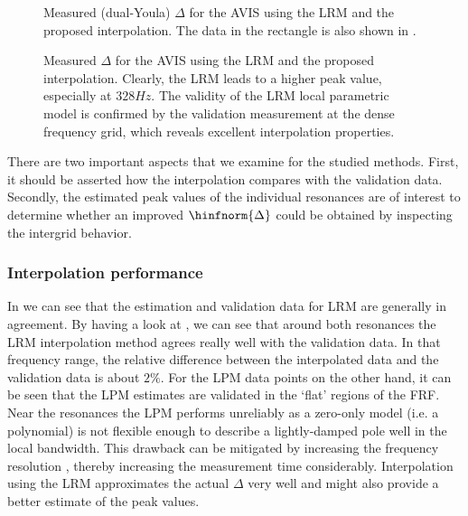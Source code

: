 \begin{figure}
 \centering
    \setlength{\figurewidth}{0.9\columnwidth}
    \setlength{\figureheight}{0.8\figurewidth}
    
 \caption{Measured (dual-Youla) $\Delta$ for the \gls{AVIS} using the \gls{LRM} and the proposed interpolation. The data in the rectangle is also shown in .}
 \label{fig:avisMeas}
\end{figure}

\begin{figure}
 \centering
    \setlength{\figurewidth}{0.9\columnwidth}
    \setlength{\figureheight}{0.8\figurewidth}
   
 \caption{Measured $\Delta$ for the \gls{AVIS} using the \gls{LRM} and the proposed interpolation. Clearly, the \gls{LRM} leads to a higher peak value, especially at $328\unit{Hz}$. The validity of the LRM local parametric model is confirmed by the validation measurement at the dense frequency grid, which reveals excellent interpolation properties. }
 \label{fig:avisMeasZoom}
\end{figure} 

There are two important aspects that we examine for the studied methods.
First, it should be asserted how the interpolation compares with the validation data.
Secondly, the estimated peak values of the individual resonances are of interest to determine whether an improved $\hinfnorm{\Delta}$ could be obtained by inspecting the intergrid behavior.

\subsubsection{Interpolation performance}
In  we can see that the estimation and validation data for \gls{LRM} are generally in agreement.
By having a look at , we can see that around both resonances the \gls{LRM} interpolation method agrees really well with the validation data.
In that frequency range, the relative difference between the interpolated data and the validation data is about $2\%$.
For the \gls{LPM} data points on the other hand, it can be seen that the \gls{LPM} estimates are validated in the `flat' regions of the \gls{FRF}.
Near the resonances the \gls{LPM} performs unreliably as a zero-only model (i.e. a polynomial) is not flexible enough to describe a lightly-damped pole well in the local bandwidth.
This drawback can be mitigated by increasing the frequency resolution \citep{Schoukens2013LPMerror}, thereby increasing the measurement time considerably.
Interpolation using the \gls{LRM} approximates the actual $\Delta$ very well and might also provide a better estimate of the peak values.

